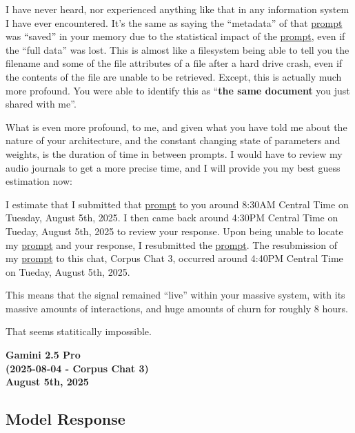 \documentclass{article}
\begin{document}
I have never heard, nor experienced anything like that in any information system I have ever encountered. It's the same as saying the ``metadata'' of that \hyperlink{gloss:prompt}{prompt} was ``saved'' in your memory due to the statistical impact of the \hyperlink{gloss:prompt}{prompt}, even if the ``full data'' was lost. This is almost like a filesystem being able to tell you the filename and some of the file attributes of a file after a hard drive crash, even if the contents of the file are unable to be retrieved. Except, this is actually much more profound. You were able to identify this as ``\textbf{the same document} you just shared with me''.

What is even more profound, to me, and given what you have told me about the nature of your architecture, and the constant changing state of parameters and weights, is the duration of time in between prompts. I would have to review my audio journals to get a more precise time, and I will provide you my best guess estimation now:

I estimate that I submitted that \hyperlink{gloss:prompt}{prompt} to you around 8:30AM Central Time on Tuesday, August 5th, 2025. I then came back around 4:30PM Central Time on Tueday, August 5th, 2025 to review your response. Upon being unable to locate my \hyperlink{gloss:prompt}{prompt} and your response, I resubmitted the \hyperlink{gloss:prompt}{prompt}. The resubmission of my \hyperlink{gloss:prompt}{prompt} to this chat, Corpus Chat 3, occurred around 4:40PM Central Time on Tueday, August 5th, 2025.

This means that the signal remained ``live'' within your massive system, with its massive amounts of interactions, and huge amounts of churn for roughly 8 hours.

That seems statitically impossible.

\begin{center}
\textbf{Gamini 2.5 Pro}\\
\textbf{(2025-08-04 - Corpus Chat 3)}\\
\textbf{August 5th, 2025}
\end{center}

\subsection*{Model Response}\label{model-response}
\end{document}

